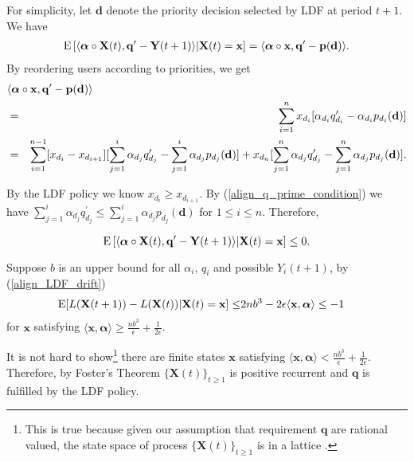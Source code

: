 \documentclass[prodmode,acmtompecs]{acmsmall}
\newcommand{\reqvec}{\mathbf{q}}
\newcommand{\reqscalar}{q}
\newcommand{\ribvec}{\boldsymbol{\alpha}}
\newcommand{\ribscalar}{\alpha}
\begin{document}
For simplicity, let $\mathbf{d}$ denote the priority decision selected by LDF at period $t+1$. We have
\begin{eqnarray*}
\expectation\left[ \langle \ribvec   \circ \mathbf{X}(t), {\reqvec}^\prime - \mathbf{Y}(t+1) \rangle | \mathbf{X}(t) = \mathbf{x} \right] = \langle \ribvec   \circ \mathbf{x}, {\reqvec}^\prime - \mathbf{p}(\mathbf{d}) \rangle. 
\end{eqnarray*}
By reordering users according to priorities, we get
\begin{eqnarray*}
\lefteqn{\langle \ribvec   \circ \mathbf{x}, {\reqvec}^\prime - \mathbf{p}(\mathbf{d}) \rangle}	\\
& = & \sum\limits_{i=1}^{n} x_{d_i} [{\ribscalar}_{d_i} {\reqscalar}^\prime_{d_i} - {\ribscalar}_{d_i} p_{d_i}(\mathbf{d})]	\\
& = & \sum\limits_{i=1}^{n-1} [x_{d_i} - x_{d_{i+1}}] [\sum\limits_{j=1}^i {\ribscalar}_{d_j} {\reqscalar}^\prime_{d_j} - \sum\limits_{j=1}^i \ribscalar_{d_j} p_{d_j}(\mathbf{d})] + x_{d_n} [\sum\limits_{j=1}^n {\ribscalar}_{d_j} {\reqscalar}^\prime_{d_j} - \sum\limits_{j=1}^n \ribscalar_{d_j} p_{d_j}(\mathbf{d})]. 
\end{eqnarray*}

By the LDF policy we know $x_{d_i} \geq x_{d_{i+1}}$. By (\ref{align_q_prime_condition}) we have $\sum\limits_{j=1}^i {\ribscalar}_{d_j} {\reqscalar}^\prime_{d_j} \leq \sum\limits_{j=1}^i \ribscalar_{d_j} p_{d_j}(\mathbf{d})$ for $1 \leq i \leq n$. Therefore, 

$$
\expectation\left[\langle \ribvec   \circ \mathbf{X}(t), {\reqvec}^\prime - \mathbf{Y}(t+1) \rangle | \mathbf{X}(t) = \mathbf{x} \right] \leq 0. 
$$

Suppose $b$ is an upper bound for all ${\ribscalar}_i$, $\reqscalar_i$ and possible $Y_i(t+1)$, by (\ref{align_LDF_drift})
\begin{align*}
\expectation[L(\mathbf{X}(t+1)) - L(\mathbf{X}(t)) | \mathbf{X}(t) = \mathbf{x}] \leq & 2n b^3 - 2 \epsilon \langle \mathbf{x}, \ribvec \rangle \leq -1
\end{align*}
for $\mathbf{x}$ satisfying $\langle\mathbf{x}, \ribvec\rangle \geq \frac{n b^3}{\epsilon} + \frac{1}{2\epsilon}$. 

It is not hard to show\footnote{This is true because given our assumption that requirement $\reqvec$ are rational valued, the state space of process $\{\mathbf{X}(t)\}_{t\geq 1}$ is in a lattice \cite{CoS13b}.} there are finite states $\mathbf{x}$ satisfying $\langle\mathbf{x}, \ribvec\rangle < \frac{n b^3}{\epsilon} + \frac{1}{2\epsilon}$. Therefore, by Foster's Theorem $\{\mathbf{X}(t)\}_{t\geq 1}$ is positive recurrent and $\reqvec$ is fulfilled by the LDF policy. 
\end{document}
